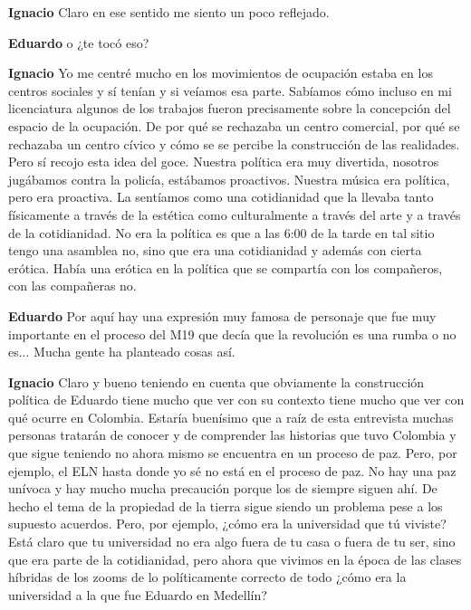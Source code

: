 \documentclass[
  spanish,
  11pt,
  a4paper,
]{scrbook}
\newenvironment{transcripcion}{
    \begin{list}{}{
        \setlength{\leftmargin}{1.5em}  %
        \setlength{\rightmargin}{0em}
        \setlength{\itemsep}{0.2em}     %
        \setlength{\parsep}{0.0em}
        \setlength{\listparindent}{0pt}
    }
}{
    \end{list}
}
\newcommand{\personaje}[1]{\textbf{#1}\quad}
\begin{document}
\begin{transcripcion}
\item \personaje{Ignacio} Claro en ese sentido me siento un poco reflejado.

\item \personaje{Eduardo} o ¿te tocó eso?

\item \personaje{Ignacio} Yo me centré mucho en los movimientos de ocupación estaba en los centros sociales y sí tenían y si veíamos esa parte. Sabíamos cómo incluso en mi licenciatura algunos de los trabajos fueron precisamente sobre la concepción del espacio de la ocupación. De por qué se rechazaba un centro comercial, por qué se rechazaba un centro cívico y cómo se se percibe la construcción de las realidades. Pero sí recojo esta idea del goce. Nuestra política era muy divertida, nosotros jugábamos contra la policía, estábamos proactivos. Nuestra música era política, pero era proactiva. La sentíamos como una cotidianidad que la llevaba tanto físicamente a través de la estética como culturalmente a través del arte y a través de la cotidianidad. No era la política es que a las 6:00 de la tarde en tal sitio tengo una asamblea no, sino que era una cotidianidad y además con cierta erótica. Había una erótica en la política que se compartía con los compañeros, con las compañeras no.

\item \personaje{Eduardo} Por aquí hay una expresión muy famosa de personaje que fue muy importante en el proceso del M19 que decía que la revolución es una rumba o no es... Mucha gente ha planteado cosas así.

\item \personaje{Ignacio} Claro y bueno teniendo en cuenta que obviamente la construcción política de Eduardo tiene mucho que ver con su contexto tiene mucho que ver con qué ocurre en Colombia. Estaría buenísimo que a raíz de esta entrevista muchas personas tratarán de conocer y de comprender las historias que tuvo Colombia y que sigue teniendo no ahora mismo se encuentra en un proceso de paz. Pero, por ejemplo, el ELN hasta donde yo sé no está en el proceso de paz. No hay una paz unívoca y hay mucho mucha precaución porque los de siempre siguen ahí. De hecho el tema de la propiedad de la tierra sigue siendo un problema pese a los supuesto acuerdos. Pero, por ejemplo, ¿cómo era la universidad que tú viviste? Está claro que tu universidad no era algo fuera de tu casa o fuera de tu ser, sino que era parte de la cotidianidad, pero ahora que vivimos en la época de las clases híbridas de los zooms de lo políticamente correcto de todo ¿cómo era la universidad a la que fue Eduardo en Medellín?


\end{transcripcion}
\end{document}
